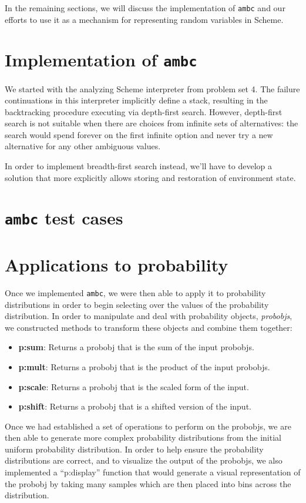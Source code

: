 \documentclass{article}
\begin{document}
In the remaining sections, we will discuss the implementation of
\texttt{ambc} and our efforts to use it as a mechanism for
representing random variables in Scheme.

\section{Implementation of \texttt{ambc}}

We started with the analyzing Scheme interpreter from problem set 4.
The failure continuations in this interpreter implicitly define a
stack, resulting in the backtracking procedure executing via
depth-first search.  However, depth-first search is not suitable when
there are choices from infinite sets of alternatives: the search would
spend forever on the first infinite option and never try a new
alternative for any other ambiguous values.

In order to implement breadth-first search instead, we'll have to
develop a solution that more explicitly allows storing and restoration
of environment state.

\section{\texttt{ambc} test cases}

\section{Applications to probability}
Once we implemented \texttt{ambc}, we were then able to apply it to probability
distributions in order to begin selecting over the values of the probability
distribution. In order to manipulate and deal with probability objects,
\textit{probobjs}, we constructed methods to transform these objects and combine
them together:

\begin{itemize}
  \item \textbf{p:sum}: Returns a probobj that is the sum of the input probobjs.
  \item \textbf{p:mult}: Returns a probobj that is the product of the input probobjs.
  \item \textbf{p:scale}: Returns a probobj that is the scaled form of the input.
  \item \textbf{p:shift}: Returns a probobj that is a shifted version of the
    input.
\end{itemize}

Once we had established a set of operations to perform on the probobjs, we are
then able to generate more complex probability distributions from the initial
uniform probability distribution. In order to help ensure the probability
distributions are correct, and to visualize the output of the probobjs, we also
implemented a ``p:display'' function that would generate a visual representation
of the probobj by taking many samples which are then placed into bins across the
distribution.
\end{document}
